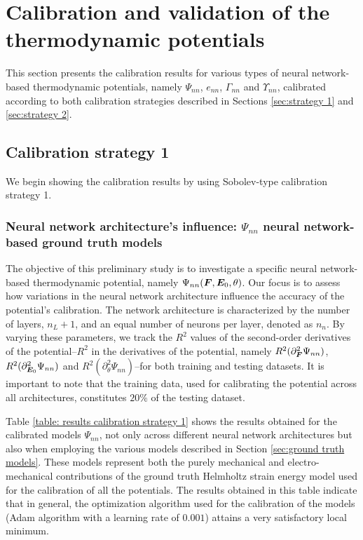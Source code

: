 \section{Calibration and validation of the thermodynamic potentials}


This section presents the calibration results for various types of neural network-based thermodynamic potentials, namely $\Psi_{nn}$, $e_{nn}$, $\Gamma_{nn}$ and $\Upsilon_{nn}$, calibrated according to both calibration strategies described in Sections \ref{sec:strategy 1} and \ref{sec:strategy 2}.

\subsection{Calibration strategy 1}

 We begin showing the calibration results by using Sobolev-type calibration strategy 1. 

\subsubsection{Neural network architecture's influence: $\Psi_{nn}$ neural network-based ground truth models}

The objective of this preliminary study is to investigate a specific neural network-based thermodynamic potential, namely $\Psi_{nn}(\boldsymbol{F},\boldsymbol{E}_0,\theta)$. Our focus is to assess how variations in the neural network architecture influence the accuracy of the potential's calibration. The network architecture is characterized by the number of layers, $n_L+1$, and an equal number of neurons per layer, denoted as $n_n$. By varying these parameters, we track the $R^2$ values of the second-order derivatives of the potential--$R^2$ in the derivatives of the potential, namely $R^2(\partial^2_{\boldsymbol{F}}\Psi_{nn})$, $R^2(\partial^2_{\boldsymbol{E}_0}\Psi_{nn})$ and $R^2(\partial^2_{\theta}\Psi_{nn})$--for both training and testing datasets. It is important to note that the training data, used for calibrating the potential across all architectures, constitutes  $20\%$ of the testing dataset.

Table \ref{table: results calibration strategy 1} shows the results obtained for the calibrated models $\Psi_{nn}$, not only across different neural network architectures but also when employing the various models described in Section  \ref{sec:ground truth models}. These models represent both the purely mechanical and electro-mechanical contributions of the ground truth Helmholtz strain energy model used for the calibration of all the potentials. The results obtained in this table indicate that in general, the optimization algorithm used for the calibration of the models (Adam algorithm with a learning rate of $0.001$) attains a very satisfactory local minimum. 

